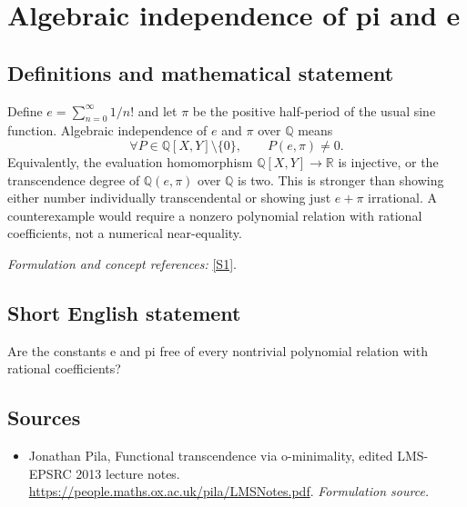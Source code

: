 \documentclass[11pt]{article}
\begin{document}
\section*{\texorpdfstring{Algebraic independence of pi and e}{Algebraic independence of pi and e}}\label{3349}
\subsection{Definitions and mathematical statement}
Define $e=\sum_{n=0}^{\infty}1/n!$ and let $\pi$ be the positive half-period of the usual sine function. Algebraic independence of $e$ and $\pi$ over ${\mathbb{Q}}$ means
\[
 \forall P\in{\mathbb{Q}}[X,Y]\setminus\{0\},\qquad P(e,\pi)\ne0.
\]
Equivalently, the evaluation homomorphism ${\mathbb{Q}}[X,Y]\to{\mathbb{R}}$ is injective, or the transcendence degree of ${\mathbb{Q}}(e,\pi)$ over ${\mathbb{Q}}$ is two. This is stronger than showing either number individually transcendental or showing just $e+\pi$ irrational. A counterexample would require a nonzero polynomial relation with rational coefficients, not a numerical near-equality.
\par\smallskip\textit{Formulation and concept references:} \href{https://people.maths.ox.ac.uk/pila/LMSNotes.pdf}{[S1]}.

\subsection{Short English statement}
Are the constants e and pi free of every nontrivial polynomial relation with rational coefficients?
\subsection{Sources}
\begin{itemize}
\item[S1]Jonathan Pila, Functional transcendence via o-minimality, edited LMS-EPSRC 2013 lecture notes.
\url{https://people.maths.ox.ac.uk/pila/LMSNotes.pdf}.
\textit{Formulation source.}
\end{itemize}
\end{document}
